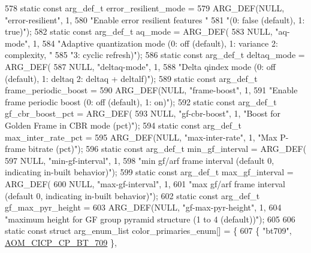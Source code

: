 \begin{DoxyCodeInclude}
{{{{{{{578 \textcolor{keyword}{static} \textcolor{keyword}{const} arg\_def\_t error\_resilient\_mode =
579     ARG\_DEF(NULL, \textcolor{stringliteral}{"error-resilient"}, 1,
580             \textcolor{stringliteral}{"Enable error resilient features "}
581             \textcolor{stringliteral}{"(0: false (default), 1: true)"});
582 \textcolor{keyword}{static} \textcolor{keyword}{const} arg\_def\_t aq\_mode = ARG\_DEF(
583     NULL, \textcolor{stringliteral}{"aq-mode"}, 1,
584     \textcolor{stringliteral}{"Adaptive quantization mode (0: off (default), 1: variance 2: complexity, "}
585     \textcolor{stringliteral}{"3: cyclic refresh)"});
586 \textcolor{keyword}{static} \textcolor{keyword}{const} arg\_def\_t deltaq\_mode = ARG\_DEF(
587     NULL, \textcolor{stringliteral}{"deltaq-mode"}, 1,
588     \textcolor{stringliteral}{"Delta qindex mode (0: off (default), 1: deltaq 2: deltaq + deltalf)"});
589 \textcolor{keyword}{static} \textcolor{keyword}{const} arg\_def\_t frame\_periodic\_boost =
590     ARG\_DEF(NULL, \textcolor{stringliteral}{"frame-boost"}, 1,
591             \textcolor{stringliteral}{"Enable frame periodic boost (0: off (default), 1: on)"});
592 \textcolor{keyword}{static} \textcolor{keyword}{const} arg\_def\_t gf\_cbr\_boost\_pct = ARG\_DEF(
593     NULL, \textcolor{stringliteral}{"gf-cbr-boost"}, 1, \textcolor{stringliteral}{"Boost for Golden Frame in CBR mode (pct)"});
594 \textcolor{keyword}{static} \textcolor{keyword}{const} arg\_def\_t max\_inter\_rate\_pct =
595     ARG\_DEF(NULL, \textcolor{stringliteral}{"max-inter-rate"}, 1, \textcolor{stringliteral}{"Max P-frame bitrate (pct)"});
596 \textcolor{keyword}{static} \textcolor{keyword}{const} arg\_def\_t min\_gf\_interval = ARG\_DEF(
597     NULL, \textcolor{stringliteral}{"min-gf-interval"}, 1,
598     \textcolor{stringliteral}{"min gf/arf frame interval (default 0, indicating in-built behavior)"});
599 \textcolor{keyword}{static} \textcolor{keyword}{const} arg\_def\_t max\_gf\_interval = ARG\_DEF(
600     NULL, \textcolor{stringliteral}{"max-gf-interval"}, 1,
601     \textcolor{stringliteral}{"max gf/arf frame interval (default 0, indicating in-built behavior)"});
602 \textcolor{keyword}{static} \textcolor{keyword}{const} arg\_def\_t gf\_max\_pyr\_height =
603     ARG\_DEF(NULL, \textcolor{stringliteral}{"gf-max-pyr-height"}, 1,
604             \textcolor{stringliteral}{"maximum height for GF group pyramid structure (1 to 4 (default))"});
605 
606 \textcolor{keyword}{static} \textcolor{keyword}{const} \textcolor{keyword}{struct }arg\_enum\_list color\_primaries\_enum[] = \{
607   \{ \textcolor{stringliteral}{"bt709"}, \hyperlink{aom__image_8h_a5267ad095a088ece3499336812503cefa9a2ebe055c0508a2a2f72b6c192fcce9}{AOM\_CICP\_CP\_BT\_709} \},
}}}}}}}
\end{DoxyCodeInclude}
